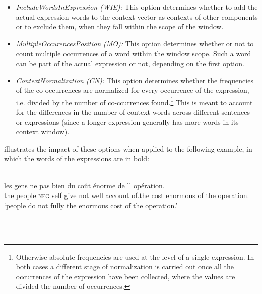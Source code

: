 \documentclass[output=paper
,modfonts
,nonflat]{langsci/langscibook}
\begin{document}
\begin{itemize}

\item {\em IncludeWordsInExpression (WIE):} This option determines
  whether to add the actual expression words to the context vector as
  contexts of other components or to exclude them, when they fall
  within the scope of the window.


\item {\em MultipleOccurencesPosition (MO):} This option determines whether
  or not to count multiple occurrences of a word within the window
  scope. Such a word can be part of the actual expression or not,
  depending on the first option.


\item {\em ContextNormalization (CN):} This option determines whether the
  frequencies of the co-occurrences are normalized for every
  occurrence of the expression, i.e. divided by the number of
  co-ccurrences found.\footnote{Otherwise absolute frequencies are
    used at the level of a single expression. In both cases a
    different stage of normalization is carried out once all the
    occurrences of the expression have been collected, where the
    values are divided the number of occurrences.} This is meant to
  account for the differences in the number of context words across
  different sentences or expressions (since a longer expression
  generally has more words in its context window).
\end{itemize}


 illustrates the impact of these options when applied to the following example, in which the words of the expressions are in bold:

\vspace*{.2cm}

\begin{minipage}{\linewidth}
\ea 
{}\\
\gll les gens ne   pas bien  du coût énorme de l' opération.\\
     the people \textsc{neg}  self give          not well account of.the cost enormous of the operation.\\

\glt `people do not fully  the enormous cost of the operation.'\\
\z
\end{minipage}\\
\\
\end{document}
